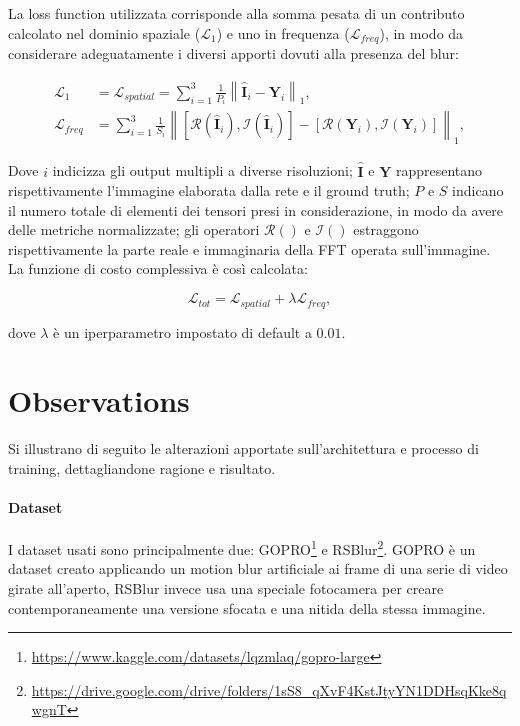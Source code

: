 \documentclass[a4paper,10pt,twocolumn]{article}
\begin{document}
La loss function utilizzata corrisponde alla somma pesata di un contributo calcolato nel dominio spaziale (\(\mathcal{L}_1\)) e uno in frequenza (\(\mathcal{L}_{freq}\)), in modo da considerare adeguatamente i diversi apporti dovuti alla presenza del blur:

\begin{align}
  \mathcal{L}_1 &= \mathcal{L}_{spatial} = \sum_{i=1}^{3}\frac{1}{P_i} \left\lVert \hat{\mathbf{I}}_i - \mathbf{Y}_i \right\rVert _1, \\
  \mathcal{L}_{freq} &= \sum_{i=1}^{3}\frac{1}{S_i} \left\lVert [\mathcal{R}(\hat{\mathbf{I}}_i), \mathcal{I}(\hat{\mathbf{I}}_i)] - [\mathcal{R}(\mathbf{Y}_i), \mathcal{I}(\mathbf{Y}_i)] \right\rVert _1,
\end{align}

Dove \(i\) indicizza gli output multipli a diverse risoluzioni; \(\hat{\mathbf{I}}\) e \(\mathbf{Y}\) rappresentano rispettivamente l'immagine elaborata dalla rete e il ground truth;
\(P\) e \(S\) indicano il numero totale di elementi dei tensori presi in considerazione, in modo da avere delle metriche normalizzate;
gli operatori \(\mathcal{R}()\) e \(\mathcal{I}()\) estraggono rispettivamente la parte reale e immaginaria della FFT operata sull'immagine.\\
La funzione di costo complessiva è così calcolata:

\begin{equation}
  \mathcal{L}_{tot} = \mathcal{L}_{spatial} + \lambda\mathcal{L}_{freq},
  \label{eq:total_loss_function}
\end{equation}

dove \(\lambda\) è un iperparametro impostato di default a \(0.01\).

\section{Observations}

Si illustrano di seguito le alterazioni apportate sull'architettura e processo di training, dettagliandone ragione e risultato.

\paragraph{Dataset}
I dataset usati sono principalmente due: GOPRO\footnote{\url{https://www.kaggle.com/datasets/lqzmlaq/gopro-large}} e RSBlur\footnote{\url{https://drive.google.com/drive/folders/1sS8_qXvF4KstJtyYN1DDHsqKke8qwgnT}}.
GOPRO è un dataset creato applicando un motion blur artificiale ai frame di una serie di video girate all'aperto, RSBlur invece usa una speciale fotocamera per creare contemporaneamente
una versione sfocata e una nitida della stessa immagine.
\end{document}
